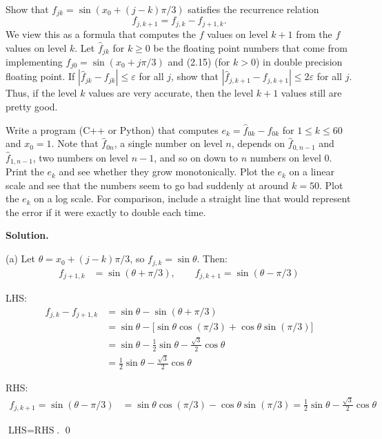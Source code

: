 \documentclass[letterpaper, 11pt]{article}
\newcommand{\1}{\mathds{1}}	%
\theoremstyle{definition}
\begin{document}
Show that $f_{jk} = \sin(x_0 + (j-k)\pi/3)$ satisfies the recurrence relation
\[
f_{j,k+1} = f_{j,k} - f_{j+1,k}. \tag{2.15}
\]
We view this as a formula that computes the $f$ values on level $k+1$ from the $f$ values on level $k$. Let $\hat{f}_{jk}$ for $k \geq 0$ be the floating point numbers that come from implementing $f_{j0} = \sin(x_0 + j\pi/3)$ and (2.15) (for $k > 0$) in double precision floating point. If $|\hat{f}_{jk} - f_{jk}| \leq \varepsilon$ for all $j$, show that $|\hat{f}_{j,k+1} - f_{j,k+1}| \leq 2\varepsilon$ for all $j$. Thus, if the level $k$ values are very accurate, then the level $k+1$ values still are pretty good.

Write a program (C++ or Python) that computes $e_k = \hat{f}_{0k} - f_{0k}$ for $1 \leq k \leq 60$ and $x_0 = 1$. Note that $\hat{f}_{0n}$, a single number on level $n$, depends on $\hat{f}_{0,n-1}$ and $\hat{f}_{1,n-1}$, two numbers on level $n-1$, and so on down to $n$ numbers on level 0. Print the $e_k$ and see whether they grow monotonically. Plot the $e_k$ on a linear scale and see that the numbers seem to go bad suddenly at around $k = 50$. Plot the $e_k$ on a log scale. For comparison, include a straight line that would represent the error if it were exactly to double each time.

\medskip

\textbf{Solution.}

(a) Let $\theta = x_0 + (j-k)\pi/3$, so $f_{j,k} = \sin\theta$. Then:
\begin{align*}
f_{j+1,k} &= \sin(\theta + \pi/3), \qquad f_{j,k+1} = \sin(\theta - \pi/3)
\end{align*}

LHS:
\begin{align*}
f_{j,k} - f_{j+1,k} &= \sin\theta - \sin(\theta + \pi/3) \\
&= \sin\theta - \bigl[\sin\theta\cos(\pi/3) + \cos\theta\sin(\pi/3)\bigr] \\
&= \sin\theta - \tfrac{1}{2}\sin\theta - \tfrac{\sqrt{3}}{2}\cos\theta \\
&= \tfrac{1}{2}\sin\theta - \tfrac{\sqrt{3}}{2}\cos\theta
\end{align*}

RHS:
\begin{align*}
f_{j,k+1} = \sin(\theta - \pi/3) &= \sin\theta\cos(\pi/3) - \cos\theta\sin(\pi/3) = \tfrac{1}{2}\sin\theta - \tfrac{\sqrt{3}}{2}\cos\theta
\end{align*}

$\text{LHS} = \text{RHS}$. \qed
\end{document}
